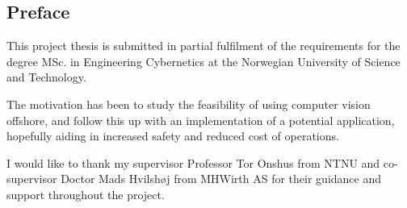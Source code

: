 \subsection*{Preface}
This project thesis is submitted in partial fulfilment of the requirements for the degree MSc. in Engineering Cybernetics at the Norwegian University of Science and Technology.

The motivation has been to study the feasibility of using computer vision offshore, and follow this up with an implementation of a potential application, hopefully aiding in increased safety and reduced cost of operations.

I would like to thank my supervisor Professor Tor Onshus from NTNU and co-supervisor Doctor Mads Hvilshøj from MHWirth AS for their guidance and support throughout the project.

\newpage
